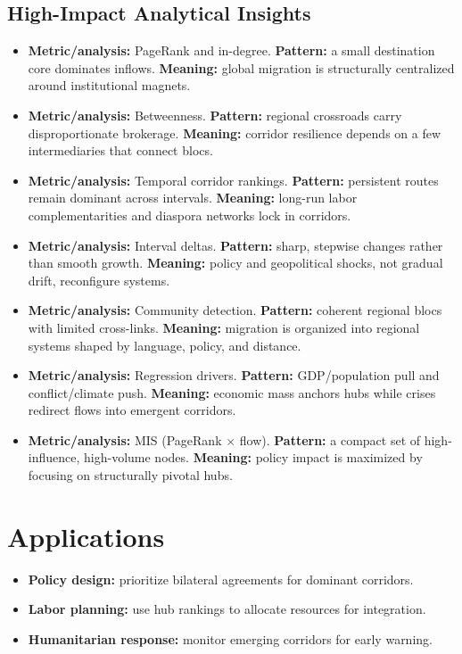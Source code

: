 \documentclass[12pt]{report}
\begin{document}
\section*{High-Impact Analytical Insights}
\begin{itemize}
  \item \textbf{Metric/analysis:} PageRank and in-degree. \textbf{Pattern:} a small destination core dominates inflows. \textbf{Meaning:} global migration is structurally centralized around institutional magnets.
  \item \textbf{Metric/analysis:} Betweenness. \textbf{Pattern:} regional crossroads carry disproportionate brokerage. \textbf{Meaning:} corridor resilience depends on a few intermediaries that connect blocs.
  \item \textbf{Metric/analysis:} Temporal corridor rankings. \textbf{Pattern:} persistent routes remain dominant across intervals. \textbf{Meaning:} long-run labor complementarities and diaspora networks lock in corridors.
  \item \textbf{Metric/analysis:} Interval deltas. \textbf{Pattern:} sharp, stepwise changes rather than smooth growth. \textbf{Meaning:} policy and geopolitical shocks, not gradual drift, reconfigure systems.
  \item \textbf{Metric/analysis:} Community detection. \textbf{Pattern:} coherent regional blocs with limited cross-links. \textbf{Meaning:} migration is organized into regional systems shaped by language, policy, and distance.
  \item \textbf{Metric/analysis:} Regression drivers. \textbf{Pattern:} GDP/population pull and conflict/climate push. \textbf{Meaning:} economic mass anchors hubs while crises redirect flows into emergent corridors.
  \item \textbf{Metric/analysis:} MIS (PageRank $\times$ flow). \textbf{Pattern:} a compact set of high-influence, high-volume nodes. \textbf{Meaning:} policy impact is maximized by focusing on structurally pivotal hubs.
\end{itemize}

\chapter{Applications}
\begin{itemize}
  \item \textbf{Policy design:} prioritize bilateral agreements for dominant corridors.
  \item \textbf{Labor planning:} use hub rankings to allocate resources for integration.
  \item \textbf{Humanitarian response:} monitor emerging corridors for early warning.
\end{itemize}
\end{document}
